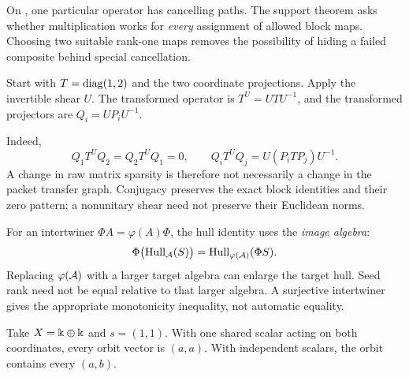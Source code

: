 On , one particular operator has cancelling paths. The support theorem asks whether multiplication works for \emph{every} assignment of allowed block maps. Choosing two suitable rank-one maps removes the possibility of hiding a failed composite behind special cancellation.


Start with $T=\diag(1,2)$ and the two coordinate projections. Apply the invertible shear $U$. The transformed operator is $T^U=UTU^{-1}$, and the transformed projectors are $Q_i=UP_iU^{-1}$.


Indeed,
\[
Q_1T^UQ_2=Q_2T^UQ_1=0,
\qquad
Q_iT^UQ_j=U(P_iTP_j)U^{-1}.
\]
A change in raw matrix sparsity is therefore not necessarily a change in the packet transfer graph. Conjugacy preserves the exact block identities and their zero pattern; a nonunitary shear need not preserve their Euclidean norms.

For an intertwiner $\Phi A=\varphi(A)\Phi$, the hull identity uses the \emph{image algebra}:
\[
\Phi\bigl(\Hull_{\AA}(S)\bigr)=\Hull_{\varphi(\AA)}(\Phi S).
\]
Replacing $\varphi(\AA)$ with a larger target algebra can enlarge the target hull. Seed rank need not be equal relative to that larger algebra. A surjective intertwiner gives the appropriate monotonicity inequality, not automatic equality.


Take $X=\kk\oplus\kk$ and $s=(1,1)$. With one shared scalar acting on both coordinates, every orbit vector is $(a,a)$. With independent scalars, the orbit contains every $(a,b)$.

